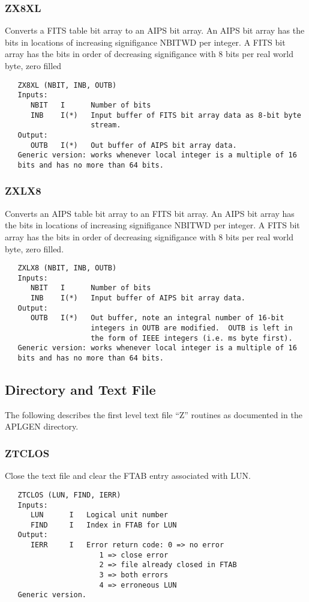 \subsubsection{ZX8XL}
Converts a FITS table bit array to an AIPS bit array. An AIPS
bit array has the bits in locations of increasing signifigance
NBITWD per integer.  A FITS bit array has the bits in order of
decreasing signifigance with 8 bits per real world byte, zero filled
\begin{verbatim}
   ZX8XL (NBIT, INB, OUTB)
   Inputs:
      NBIT   I      Number of bits
      INB    I(*)   Input buffer of FITS bit array data as 8-bit byte
                    stream.
   Output:
      OUTB   I(*)   Out buffer of AIPS bit array data.
   Generic version: works whenever local integer is a multiple of 16
   bits and has no more than 64 bits.
\end{verbatim}

\subsubsection{ZXLX8}
Converts an AIPS table bit array to an FITS bit array. An AIPS
bit array has the bits in locations of increasing signifigance
NBITWD per integer.  A FITS bit array has the bits in order of
decreasing signifigance with 8 bits per real world byte, zero filled.
\begin{verbatim}
   ZXLX8 (NBIT, INB, OUTB)
   Inputs:
      NBIT   I      Number of bits
      INB    I(*)   Input buffer of AIPS bit array data.
   Output:
      OUTB   I(*)   Out buffer, note an integral number of 16-bit
                    integers in OUTB are modified.  OUTB is left in
                    the form of IEEE integers (i.e. ms byte first).
   Generic version: works whenever local integer is a multiple of 16
   bits and has no more than 64 bits.
\end{verbatim}

\subsection{Directory and Text File }

   The following describes the first level text file ``Z''
routines as documented in the APLGEN directory.

\subsubsection{ZTCLOS}
Close the text file and clear the FTAB entry associated with LUN.
\begin{verbatim}
   ZTCLOS (LUN, FIND, IERR)
   Inputs:
      LUN      I   Logical unit number
      FIND     I   Index in FTAB for LUN
   Output:
      IERR     I   Error return code: 0 => no error
                      1 => close error
                      2 => file already closed in FTAB
                      3 => both errors
                      4 => erroneous LUN
   Generic version.
\end{verbatim}

